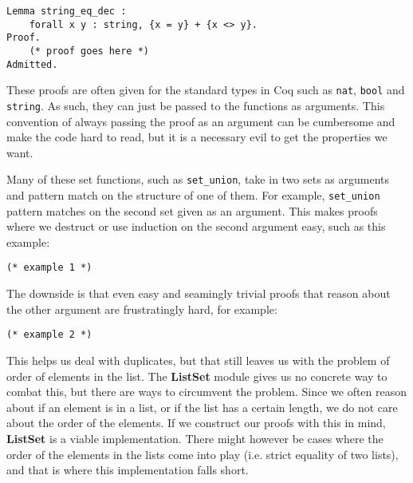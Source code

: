 \begin{minipage}{\linewidth}
\begin{lstlisting}[language=Coq, label={lst:string_eq_dec}, caption={Decidability proof for string equality in Coq}]
Lemma string_eq_dec :
    forall x y : string, {x = y} + {x <> y}.
Proof.
    (* proof goes here *)
Admitted.
\end{lstlisting}
\end{minipage}

These proofs are often given for the standard types in Coq such as \lstinline[language=Coq]{nat},
\lstinline[language=Coq]{bool} and \lstinline[language=Coq]{string}.
As such, they can just be passed to the functions as arguments.
This convention of always passing the proof as an argument can be cumbersome and make the code hard to read,
but it is a necessary evil to get the properties we want.

Many of these set functions, such as \lstinline[language=Coq]{set_union},
take in two sets as arguments and pattern match on the structure of one of them.
For example, \lstinline[language=Coq]{set_union} pattern matches on the second set given as an argument.
This makes proofs where we destruct or use induction on the second argument easy, such as this example:

\begin{minipage}{\linewidth}
\begin{lstlisting}[language=Coq, label={lst:set_op_ex1}, caption={Easy proof of lemma in \lstinline{ListSet}}]
(* example 1 *)
\end{lstlisting}
\end{minipage}

The downside is that even easy and seamingly trivial proofs that reason about the other argument are frustratingly hard,
for example:

\begin{minipage}{\linewidth}
\begin{lstlisting}[language=Coq, label={lst:set_op_ex2}, caption={Hard proof of lemma in \lstinline{ListSet}}]
(* example 2 *)
\end{lstlisting}
\end{minipage}

This helps us deal with duplicates, but that still leaves us with the problem of order of elements in the list.
The \textbf{ListSet} module gives us no concrete way to combat this, but there are ways to circumvent the problem.
Since we often reason about if an element is in a list, or if the list has a certain length,
we do not care about the order of the elements.
If we construct our proofs with this in mind, \textbf{ListSet} is a viable implementation.
There might however be cases where the order of the elements in the lists come into play (i.e. strict equality of two lists),
and that is where this implementation falls short.

